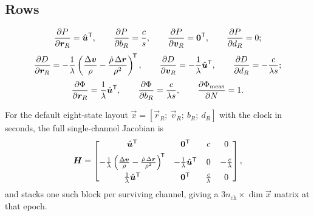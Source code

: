 \subsection{Rows}

\begin{equation}
  \label{eq:gnss-jac-pseudorange}
  \frac{\partial P}{\partial \bm{r}_R} = \hat{\bm{u}}^{\mathsf{T}},
  \qquad
  \frac{\partial P}{\partial b_R} = \frac{c}{s},
  \qquad
  \frac{\partial P}{\partial \bm{v}_R} = \bm{0}^{\mathsf{T}},
  \qquad
  \frac{\partial P}{\partial d_R} = 0 ;
\end{equation}
\begin{equation}
  \label{eq:gnss-jac-doppler}
  \frac{\partial D}{\partial \bm{r}_R}
    = -\frac{1}{\lambda}\left( \frac{\Delta\bm{v}}{\rho}
       - \frac{\dot\rho\,\Delta\bm{r}}{\rho^{2}} \right)^{\!\mathsf{T}},
  \qquad
  \frac{\partial D}{\partial \bm{v}_R} = -\frac{1}{\lambda}\hat{\bm{u}}^{\mathsf{T}},
  \qquad
  \frac{\partial D}{\partial d_R} = -\frac{c}{\lambda s} ;
\end{equation}
\begin{equation}
  \label{eq:gnss-jac-carrier}
  \frac{\partial \Phi}{\partial \bm{r}_R} = \frac{1}{\lambda}\hat{\bm{u}}^{\mathsf{T}},
  \qquad
  \frac{\partial \Phi}{\partial b_R} = \frac{c}{\lambda s},
  \qquad
  \frac{\partial \Phi_{\mathrm{meas}}}{\partial N} = 1 .
\end{equation}

For the default eight-state layout $\vec{x} = [\vec{r}_R;\ \vec{v}_R;\ b_R;\
d_R]$ with the clock in seconds, the full single-channel Jacobian is
\begin{equation}
  \label{eq:gnss-jac-block}
  \bm{H} =
  \begin{bmatrix}
    \hat{\bm{u}}^{\mathsf{T}} & \bm{0}^{\mathsf{T}} & c & 0 \\[4pt]
    -\frac{1}{\lambda}\left(\frac{\Delta\bm{v}}{\rho}
      - \frac{\dot\rho\,\Delta\bm{r}}{\rho^{2}}\right)^{\!\mathsf{T}}
      & -\frac{1}{\lambda}\hat{\bm{u}}^{\mathsf{T}} & 0 & -\frac{c}{\lambda} \\[6pt]
    \frac{1}{\lambda}\hat{\bm{u}}^{\mathsf{T}} & \bm{0}^{\mathsf{T}} & \frac{c}{\lambda} & 0
  \end{bmatrix},
\end{equation}
and  stacks one such block per
surviving channel, giving a $3 n_{\mathrm{ch}} \times \dim\vec{x}$ matrix at
that epoch.

